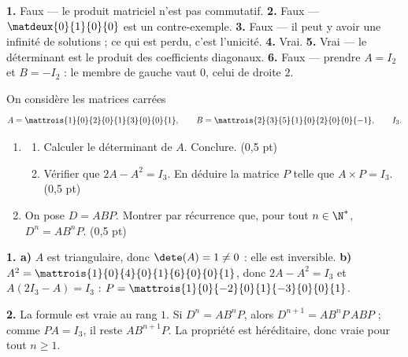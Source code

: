 \begin{corrige}[je me teste]
\textbf{1.} Faux — le produit matriciel n'est pas commutatif.
\textbf{2.} Faux — $\matdeux{0}{1}{0}{0}$ est un contre-exemple.
\textbf{3.} Faux — il peut y avoir une infinité de solutions ; ce qui est
perdu, c'est l'unicité.
\textbf{4.} Vrai.
\textbf{5.} Vrai — le déterminant est le produit des coefficients diagonaux.
\textbf{6.} Faux — prendre $A = I_{2}$ et $B = -I_{2}$ : le membre de gauche
vaut $0$, celui de droite $2$.
\end{corrige}

\begin{commeaubac}
On considère les matrices carrées
\[
  A = \mattrois{1}{0}{2}{0}{1}{3}{0}{0}{1}, \qquad
  B = \mattrois{2}{3}{5}{1}{0}{2}{0}{0}{-1}, \qquad I_{3}.
\]
\begin{enumerate}[label=\textbf{\arabic*.}, leftmargin=*, itemsep=0.25em]
  \item \begin{enumerate}[label=\textbf{\alph*)}, leftmargin=1.4em]
          \item Calculer le déterminant de $A$. Conclure.
                \hfill\textup{(0,5 pt)}
          \item Vérifier que $2A-A^{2} = I_{3}$. En déduire la matrice $P$
                telle que $A \times P = I_{3}$. \hfill\textup{(0,5 pt)}
        \end{enumerate}
  \item On pose $D = ABP$. Montrer par récurrence que, pour tout
        $n \in \N^{*}$, $D^{n} = AB^{n}P$. \hfill\textup{(0,5 pt)}
\end{enumerate}
\end{commeaubac}

\begin{corrige}
\textbf{1. a)} $A$ est triangulaire, donc $\dete(A) = 1 \neq 0$ : elle est
inversible.
\textbf{b)} $A^{2} = \mattrois{1}{0}{4}{0}{1}{6}{0}{0}{1}$, donc
$2A-A^{2} = I_{3}$ et $A\left(2I_{3}-A\right) = I_{3}$ :
$P = \mattrois{1}{0}{-2}{0}{1}{-3}{0}{0}{1}$.

\textbf{2.} La formule est vraie au rang $1$. Si $D^{n} = AB^{n}P$, alors
$D^{n+1} = AB^{n}P\,ABP$ ; comme $PA = I_{3}$, il reste $AB^{n+1}P$. La
propriété est héréditaire, donc vraie pour tout $n \geq 1$.
\end{corrige}

